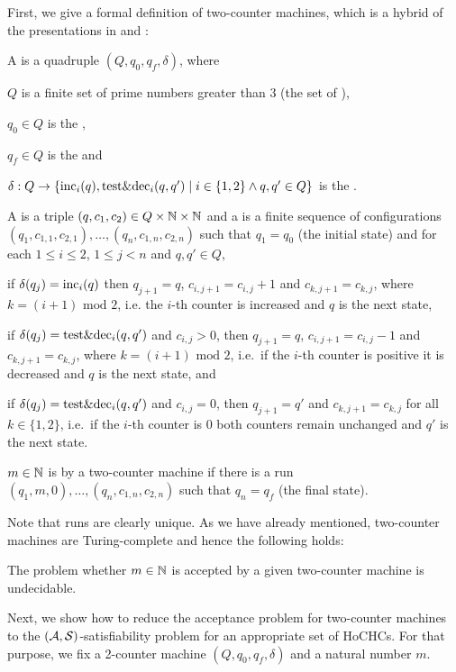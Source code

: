 \documentclass[a4paper,twoside,notitlepage,openright,11pt]{report}
\begin{document}
First, we give a formal definition of two-counter machines, which is a hybrid of the presentations in \cite{HVW17} and \cite{D72}:
\begin{definition}
  A  is a quadruple $(Q,q_0,q_f,\delta)$, where
  \begin{thmlist}
  \item $Q$ is a finite set of prime numbers greater than $3$ (the set of ),
  \item $q_0\in Q$ is the ,
  \item $q_f\in Q$ is the  and
  \item $\delta: Q\to\{\operatorname{inc}_i(q),\operatorname{test\&dec}_i(q,q')\mid i\in\{1,2\}\land q,q'\in Q\}$ is the .
  \end{thmlist}
  A  is a triple $(q,c_1,c_2)\in Q\times\mathbb N\times\mathbb N$ and a  is a finite sequence of configurations $(q_1,c_{1,1},c_{2,1}),\ldots,(q_n,c_{1,n},c_{2,n})$ such that $q_1=q_0$ (the initial state) and for each $1\leq i\leq 2$, $1\leq j<n$ and $q,q'\in Q$,
  \begin{thmlist}
  \item if $\delta(q_j)=\operatorname{inc}_i(q)$ then $q_{j+1}=q$, $c_{i,j+1}=c_{i,j}+1$ and $c_{k,j+1}=c_{k,j}$, where $k=(i+1)\text{ mod }2$, i.e. the $i$-th counter is increased and $q$ is the next state,
  \item if $\delta(q_j)=\operatorname{test\&dec}_i(q,q')$ and $c_{i,j}>0$, then $q_{j+1}=q$, $c_{i,j+1}=c_{i,j}-1$ and $c_{k,j+1}=c_{k,j}$, where $k=(i+1)\text{ mod }2$, i.e.\ if the $i$-th counter is positive it is decreased and $q$ is the next state, and
  \item if $\delta(q_j)=\operatorname{test\&dec}_i(q,q')$ and $c_{i,j}=0$, then $q_{j+1}=q'$ and $c_{k,j+1}=c_{k,j}$ for all $k\in\{1,2\}$, i.e.\ if the $i$-th counter is 0 both counters remain unchanged and $q'$ is the next state.
  \end{thmlist}
  $m\in\mathbb N$ is  by a two-counter machine if there is a run $(q_1,m,0),\ldots,(q_n,c_{1,n},c_{2,n})$ such that $q_n=q_f$ (the final state).
\end{definition}
Note that runs are clearly unique. As we have already mentioned, two-counter machines are Turing-complete and hence the following holds:
\begin{proposition}[\cite{M67}]
  \label{prop:undec2counter}
  The problem whether $m\in\mathbb N$ is accepted by a given two-counter machine is undecidable.
\end{proposition}
Next, we show how to reduce the acceptance problem for two-counter machines to the $(\mathcal A,\mathcal S)$-satisfiability problem for an appropriate set of HoCHCs. For that purpose, we fix a 2-counter machine $(Q,q_0,q_f,\delta)$ and a natural number $m$.
\end{document}

